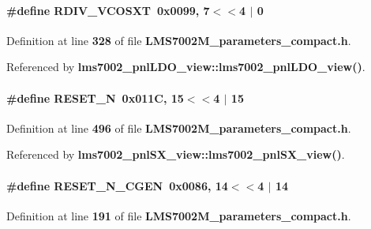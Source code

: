 \paragraph[{R\+D\+I\+V\+\_\+\+V\+C\+O\+S\+XT}]{\setlength{\rightskip}{0pt plus 5cm}\#define R\+D\+I\+V\+\_\+\+V\+C\+O\+S\+XT~0x0099, 7$<$$<$4 $\vert$  0}\label{LMS7002M__parameters__compact_8h_a74cbb785ccfd394da26303add3c1ac72}


Definition at line {\bf 328} of file {\bf L\+M\+S7002\+M\+\_\+parameters\+\_\+compact.\+h}.



Referenced by {\bf lms7002\+\_\+pnl\+L\+D\+O\+\_\+view\+::lms7002\+\_\+pnl\+L\+D\+O\+\_\+view()}.

\paragraph[{R\+E\+S\+E\+T\+\_\+N}]{\setlength{\rightskip}{0pt plus 5cm}\#define R\+E\+S\+E\+T\+\_\+N~0x011\+C, 15$<$$<$4 $\vert$  15}\label{LMS7002M__parameters__compact_8h_ac707197d31c1474ee6b45ef4550ad357}


Definition at line {\bf 496} of file {\bf L\+M\+S7002\+M\+\_\+parameters\+\_\+compact.\+h}.



Referenced by {\bf lms7002\+\_\+pnl\+S\+X\+\_\+view\+::lms7002\+\_\+pnl\+S\+X\+\_\+view()}.

\paragraph[{R\+E\+S\+E\+T\+\_\+\+N\+\_\+\+C\+G\+EN}]{\setlength{\rightskip}{0pt plus 5cm}\#define R\+E\+S\+E\+T\+\_\+\+N\+\_\+\+C\+G\+EN~0x0086, 14$<$$<$4 $\vert$  14}\label{LMS7002M__parameters__compact_8h_acf0536b93499cf53e1ea2773b8c2d4ac}


Definition at line {\bf 191} of file {\bf L\+M\+S7002\+M\+\_\+parameters\+\_\+compact.\+h}.



